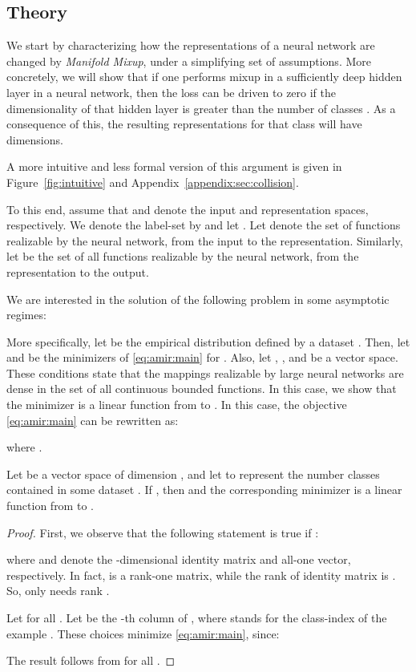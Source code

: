 \documentclass{article} \usepackage[preprint]{nips_2018}
\newcommand{\manifoldmixup}{\textit{Manifold Mixup}}
\begin{document}
\subsection{Theory}
\label{sec:theory}

We start by characterizing how the representations of a neural network are changed by \manifoldmixup{}, under a simplifying set of assumptions.
More concretely, we will show that if one performs mixup in a sufficiently deep hidden layer in a neural network, then the loss can be driven to zero if the dimensionality of that hidden layer  is greater than the number of classes .
As a consequence of this, the resulting representations for that class will have  dimensions.

A more intuitive and less formal version of this argument is given in Figure~\ref{fig:intuitive} and Appendix~\ref{appendix:sec:collision}.  

To this end, assume that  and  denote the input and representation spaces, respectively. We denote the label-set by  and let . Let  denote the set of functions realizable by the neural network, from the input to the representation. Similarly, let  be the set of all functions realizable by the neural network, from the representation to the output.

We are interested in the solution of the following problem in some asymptotic regimes:

More specifically, let  be the empirical distribution defined by a dataset .
Then, let  and  be the minimizers of \eqref{eq:amir:main} for .
Also, let , , and  be a vector space.
These conditions \citep{cybenko1989approximation} state that the mappings realizable by large neural networks are dense in the set of all continuous bounded functions.
In this case, we show that the minimizer  is a linear function from  to .
In this case, the objective \eqref{eq:amir:main} can be rewritten as:

where .
\begin{thm2}
Let  be a vector space of dimension , and let  to represent the number classes contained in some dataset . If , then  and the corresponding minimizer  is a linear function from  to .
\label{thm:mainThm}
\end{thm2}
\begin{proof}
First, we observe that the following statement is true if :

where  and  denote the -dimensional identity matrix and all-one vector, respectively. In fact,  is a rank-one matrix, while the rank of identity matrix is . So,  only needs rank .

Let  for all .
Let  be the -th column of , where  stands for the class-index of the example .
These choices minimize \eqref{eq:amir:main}, since:

The result follows from  for all .
\end{proof}
\end{document}
